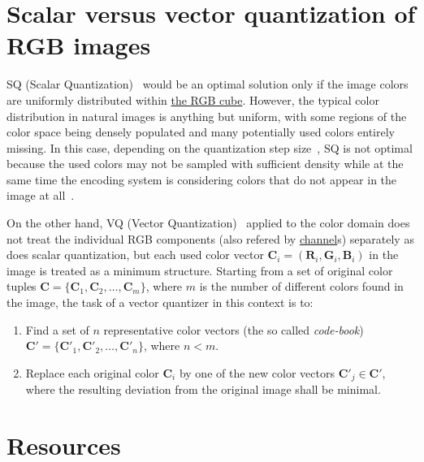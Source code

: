 \section{Scalar versus vector quantization of RGB images}

SQ (Scalar
Quantization)~\cite{vruiz__scalar_quantization,sayood2017introduction}
would be an optimal solution only if the image colors are uniformly
distributed within
\href{https://en.wikipedia.org/wiki/RGB_color_model}{the RGB
  cube}. However, the typical color distribution in natural images is
anything but uniform, with some regions of the color space being
densely populated and many potentially used colors entirely
missing. In this case, depending on the quantization step
size~\cite{vruiz__signal_quantization}, SQ is not optimal because the
used colors may not be sampled with suﬃcient density while at the same
time the encoding system is considering colors that do not appear in
the image at all~\cite{burger2016digital}.

On the other hand, VQ (Vector
Quantization)~\cite{vruiz__vector_quantization,sayood2017introduction}
applied to the color domain does not treat the individual RGB
components (also refered by
\href{https://en.wikipedia.org/wiki/Color_image}{channel}s) separately
as does scalar quantization, but each used color vector ${\mathbf C}_i
= ({\mathbf R}_i, {\mathbf G}_i, {\mathbf B}_i )$ in the image is
treated as a minimum structure. Starting from a set of original color
tuples ${\mathbf C} = \{{\mathbf C}_1, {\mathbf C}_2, \ldots ,{\mathbf
  C}_m\}$, where $m$ is the number of different colors found in the
image, the task of a vector quantizer in this context is to:
\begin{enumerate}
\item Find a set of $n$ representative color vectors (the so called
  \emph{code-book}) ${\mathbf C}' = \{{\mathbf C}'_1, {\mathbf C}'_2
  ,\ldots , {\mathbf C}'_n \}$, where $n < m$.
\item Replace each original color ${\mathbf C}_i$ by one of the new
  color vectors ${\mathbf C}'_j\in {\mathbf C}'$, where the resulting
  deviation from the original image shall be minimal.
\end{enumerate}



\section{Resources}

\renewcommand{\addcontentsline}[3]{}%


